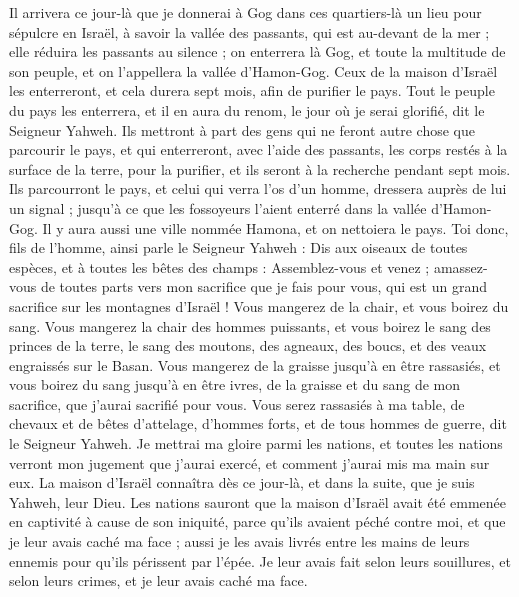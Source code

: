 \begin{multicols}{2}
Il arrivera ce jour-là que je donnerai à Gog dans ces quartiers-là un lieu pour sépulcre en Israël, à savoir la vallée des passants, qui est au-devant de la mer ; elle réduira les passants au silence ; on enterrera là Gog, et toute la multitude de son peuple, et on l'appellera la vallée d'Hamon-Gog.
Ceux de la maison d'Israël les enterreront, et cela durera sept mois, afin de purifier le pays.
Tout le peuple du pays les enterrera, et il en aura du renom, le jour où je serai glorifié, dit le Seigneur Yahweh.
Ils mettront à part des gens qui ne feront autre chose que parcourir le pays, et qui enterreront, avec l'aide des passants, les corps restés à la surface de la terre, pour la purifier, et ils seront à la recherche pendant sept mois.
Ils parcourront le pays, et celui qui verra l'os d'un homme, dressera auprès de lui un signal ; jusqu'à ce que les fossoyeurs l'aient enterré dans la vallée d'Hamon-Gog.
Il y aura aussi une ville nommée Hamona, et on nettoiera le pays.
Toi donc, fils de l'homme, ainsi parle le Seigneur Yahweh : Dis aux oiseaux de toutes espèces, et à toutes les bêtes des champs : Assemblez-vous et venez ; amassez-vous de toutes parts vers mon sacrifice que je fais pour vous, qui est un grand sacrifice sur les montagnes d'Israël ! Vous mangerez de la chair, et vous boirez du sang.
Vous mangerez la chair des hommes puissants, et vous boirez le sang des princes de la terre, le sang des moutons, des agneaux, des boucs, et des veaux engraissés sur le Basan.
Vous mangerez de la graisse jusqu'à en être rassasiés, et vous boirez du sang jusqu'à en être ivres, de la graisse et du sang de mon sacrifice, que j'aurai sacrifié pour vous.
Vous serez rassasiés à ma table, de chevaux et de bêtes d'attelage, d'hommes forts, et de tous hommes de guerre, dit le Seigneur Yahweh.
Je mettrai ma gloire parmi les nations, et toutes les nations verront mon jugement que j'aurai exercé, et comment j'aurai mis ma main sur eux.
La maison d'Israël connaîtra dès ce jour-là, et dans la suite, que je suis Yahweh, leur Dieu.
Les nations sauront que la maison d'Israël avait été emmenée en captivité à cause de son iniquité, parce qu'ils avaient péché contre moi, et que je leur avais caché ma face ; aussi je les avais livrés entre les mains de leurs ennemis pour qu'ils périssent par l'épée.
Je leur avais fait selon leurs souillures, et selon leurs crimes, et je leur avais caché ma face.

\end{multicols}
